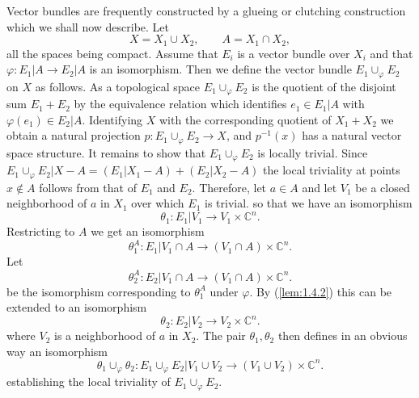 Vector bundles are frequently constructed by a glueing or clutching construction which we shall now describe. Let
\begin{equation*}
    X = X_1 \cup X_2, \qquad A = X_1 \cap X_2,
\end{equation*}
all the spaces being compact. Assume that $E_i$ is a vector bundle over $X_i$ and that $\varphi: E_1 \vert A \to E_2 \vert A $ is an isomorphism. Then we define the vector bundle $E_1 \cup_\varphi E_2$ on $X$ as follows. As a topological space $E_1 \cup_\varphi E_2$ is the quotient of the disjoint sum $E_1 + E_2$ by the equivalence relation which identifies $e_1 \in E_1 \vert A$ with $\varphi(e_1) \in E_2 \vert A$. Identifying $X$ with the corresponding quotient of $X_1 + X_2$ we obtain a natural projection $p: E_1 \cup_\varphi E_2 \to X$, and $p^{-1}(x)$ has a natural vector space structure. It remains to show that $E_1 \cup_\varphi E_2$ is locally trivial. Since $E_1 \cup_\varphi E_2 \vert X - A = (E_1 \vert X_1 - A) + (E_2 \vert X_2 - A)$ the local triviality at points $x \notin A$ follows from that of $E_1$ and $E_2$. Therefore, let $a \in A$ and let $V_1$ be a closed neighborhood of $a$ in $X_1$ over which $E_1$ is trivial. so that we have an isomorphism
\begin{equation*}
    \theta_1: E_1 \vert V_1 \to V_1 \times \mathbb{C}^n.
\end{equation*}
Restricting to $A$ we get an isomorphism
\begin{equation*}
    \theta_1^A: E_1 \vert V_1 \cap A \to (V_1 \cap A) \times \mathbb{C}^n.
\end{equation*}
Let
\begin{equation*}
    \theta_2^A: E_2 \vert V_1 \cap A \to (V_1 \cap A) \times \mathbb{C}^n.
\end{equation*}
be the isomorphism corresponding to $\theta_1^A$ under $\varphi$. By (\ref{lem:1.4.2}) this can be extended to an isomorphism
\begin{equation*}
    \theta_2: E_2 \vert V_2 \to V_2 \times \mathbb{C}^n.
\end{equation*}
where $V_2$ is a neighborhood of $a$ in $X_2$. The pair $\theta_1, \theta_2$ then defines in an obvious way an isomorphism
\begin{equation*}
    \theta_1 \cup_\varphi \theta_2: E_1 \cup_\varphi E_2 \vert V_1 \cup V_2 \to (V_1 \cup V_2) \times \mathbb{C}^n.
\end{equation*}
establishing the local triviality of $E_1 \cup_\varphi E_2$. \par 

